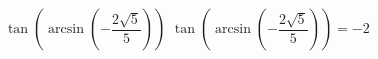  {$\tan\left(\arcsin\left(-\dfrac{2\sqrt{5}}{5}\right)\right)$}
{ $\tan\left(\arcsin\left(-\dfrac{2\sqrt{5}}{5}\right)\right)=-2$}

